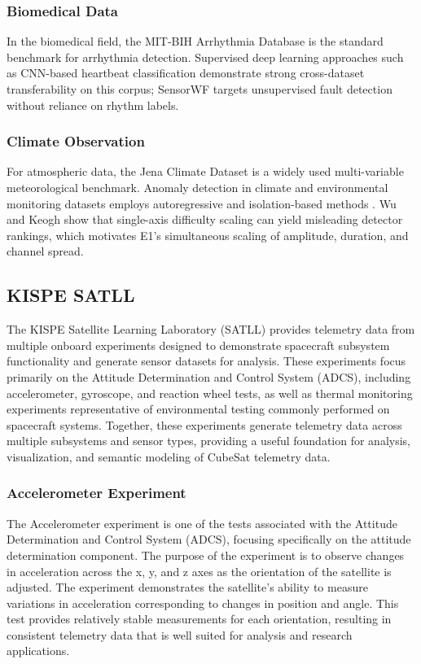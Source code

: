 \documentclass[conference]{IEEEtran}
\newcommand\Logan[1]{\leavevmode{\footnotesize\textbf{[Logan: #1]}}}
\begin{document}
\subsubsection{Biomedical Data}
In the biomedical field, the MIT-BIH Arrhythmia Database \cite{moody2001mitbih} is the standard benchmark for arrhythmia detection. Supervised deep learning approaches such as CNN-based heartbeat classification \cite{kachuee2018ecgclass} demonstrate strong cross-dataset transferability on this corpus; SensorWF targets unsupervised fault detection without reliance on rhythm labels.
\Logan{Expand}

\subsubsection{Climate Observation}
For atmospheric data, the Jena Climate Dataset \cite{jena_climate} is a widely used multi-variable meteorological benchmark. Anomaly detection in climate and environmental monitoring datasets employs autoregressive and isolation-based methods \cite{martinez2020climate}. Wu and Keogh \cite{wu2022benchmarks} show that single-axis difficulty scaling can yield misleading detector rankings, which motivates E1's simultaneous scaling of amplitude, duration, and channel spread.
\Logan{Expand}

\subsection{KISPE SATLL}

The KISPE Satellite Learning Laboratory (SATLL) provides telemetry data from multiple onboard experiments designed to demonstrate spacecraft subsystem functionality and generate sensor datasets for analysis. These experiments focus primarily on the Attitude Determination and Control System (ADCS), including accelerometer, gyroscope, and reaction wheel tests, as well as thermal monitoring experiments representative of environmental testing commonly performed on spacecraft systems. Together, these experiments generate telemetry data across multiple subsystems and sensor types, providing a useful foundation for analysis, visualization, and semantic modeling of CubeSat telemetry data.

\subsubsection{Accelerometer Experiment}
The Accelerometer experiment is one of the tests associated with the Attitude Determination and Control System (ADCS), focusing specifically on the attitude determination component. The purpose of the experiment is to observe changes in acceleration across the x, y, and z axes as the orientation of the satellite is adjusted. The experiment demonstrates the satellite's ability to measure variations in acceleration corresponding to changes in position and angle. This test provides relatively stable measurements for each orientation, resulting in consistent telemetry data that is well suited for analysis and research applications.
\end{document}
